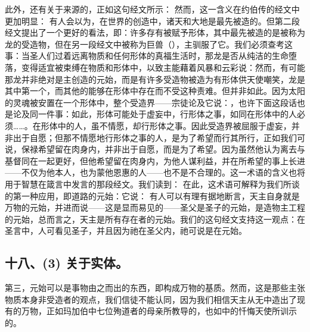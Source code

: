 此外，还有关于来源的，正如这句经文所示： 然而，这一含义在约伯传的经文中更加明显： 有人会以为，在世界的创造中，诸天和大地是最先被造的。但第二段经文提出了一个更好的看法，即：许多存有被赋予形体，其中最先被造的是被称为龙的受造物，但在另一段经文中被称为巨兽（），主驯服了它。我们必须查考这事：当圣人们过着远离物质和任何形体的真福生活时，那龙是否从纯洁的生命堕落，变得适宜被束缚在物质和形体中，以致主能藉着风暴和云彩说：然而，有可能那龙并非绝对是主创造的元始，而是有许多受造物被造为有形体供天使嘲笑，龙是其中第一个，而其他的能够在形体中存在而不受这种责难。但并非如此。因为太阳的灵魂被安置在一个形体中，整个受造界——宗徒论及它说：，也许下面这段话也是论及同一件事：如此，形体可能处于虚妄中，行形体之事，如同在形体中的人必须……。在形体中的人，虽不情愿，却行形体之事。因此受造界被屈服于虚妄，并非出于自愿；但那不情愿地行形体之事的人，是为了希望而行其所行，正如我们可说，保禄希望留在肉身内，并非出于自愿，而是为了希望。因为虽然他认为离去与基督同在一起更好，但他希望留在肉身内，为他人谋利益，并在所希望的事上长进——不仅为他本人，也为蒙他恩惠的人——也不是不合理的。这一术语的含义也将用于智慧在箴言中发言的那段经文。我们读到： 在此，这术语可解释为我们所谈的第一种应用，即道路的元始：它说： 有人可以有理有据地断言，天主自身就是万物的元始，并进而说——这是显而易见的——圣父是圣子的元始，是造物主工程的元始，总而言之，天主是所有存在者的元始。我们的这句经文支持这一观点：在圣言中，人可看见圣子，并且因为祂在圣父内，祂可说是在元始。\par


\subsection{十八、(3) 关于实体。}

第三，元始可以是事物由之而出的东西，即构成万物的基质。然而，这是那些主张物质本身非受造者的观点，我们信徒不能认同，因为我们相信天主从无中造出了现有的万物，正如玛加伯中七位殉道者的母亲所教导的，也如中的忏悔天使所训示的。\par

